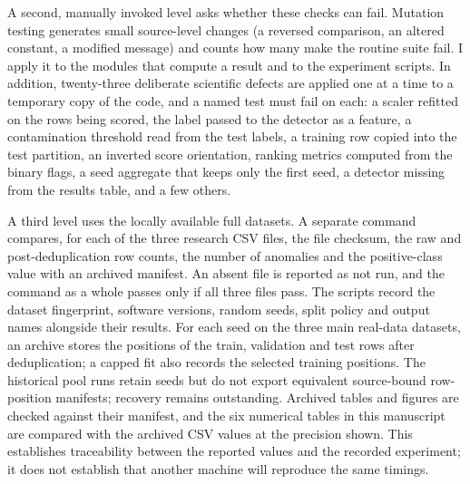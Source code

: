 \documentclass[conference]{IEEEtran}
\begin{document}
A second, manually invoked level asks whether these checks can fail.
Mutation testing generates small source-level changes (a reversed
comparison, an altered constant, a modified message) and counts how many
make the routine suite fail. I apply it to the modules that compute a
result and to the experiment scripts. In addition, twenty-three deliberate
scientific defects are applied one at a time to a temporary copy of the
code, and a named test must fail on each: a scaler refitted on the rows
being scored, the label passed to the detector as a feature, a contamination
threshold read from the test labels, a training row copied into the test
partition, an inverted score orientation, ranking metrics computed from the
binary flags, a seed aggregate that keeps only the first seed, a detector
missing from the results table, and a few others.

A third level uses the locally available full datasets. A separate command
compares, for each of the three research CSV files, the file checksum, the raw
and post-deduplication row counts, the number of anomalies and the
positive-class value with an archived manifest. An absent file is reported as
not run, and the command as a whole passes only if all three files pass. The
scripts record the dataset fingerprint, software versions, random seeds,
split policy and output names alongside their results. For each seed on the three main real-data datasets, an archive stores the positions of the train, validation and test rows
after deduplication; a capped fit also records the selected training
positions. The historical pool runs retain seeds but do not export equivalent
source-bound row-position manifests; recovery remains outstanding.
Archived tables and figures are checked against their manifest,
and the six numerical tables in this manuscript are compared with the
archived CSV values at the precision shown. This establishes traceability
between the reported values and the recorded experiment; it does not
establish that another machine will reproduce the same timings.
\end{document}
